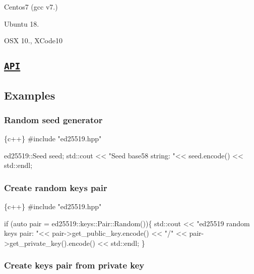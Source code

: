 \begin{DoxyEnumerate}
\item Centos7 (gcc v7.)
\end{DoxyEnumerate}
\begin{DoxyEnumerate}
\item Ubuntu 18.
\end{DoxyEnumerate}
\begin{DoxyEnumerate}
\item O\+SX 10., X\+Code10
\end{DoxyEnumerate}

\subsection*{\href{https://htmlpreview.github.io/?https://github.com/dnevera/ed25519cpp/blob/master/docs/html/namespaces.html}{\tt A\+PI}}

\subsection*{Examples}

\subsubsection*{Random seed generator}


\begin{DoxyCode}
\{c++\}
#include "ed25519.hpp"


ed25519::Seed seed;
std::cout << "Seed base58 string: "<< seed.encode() << std::endl;
\end{DoxyCode}


\subsubsection*{Create random keys pair}


\begin{DoxyCode}
\{c++\}
#include "ed25519.hpp"

if (auto pair = ed25519::keys::Pair::Random())\{
    std::cout << "ed25519 random keys pair: "<< pair->get\_public\_key.encode() << "/" << 
       pair->get\_private\_key().encode() << std::endl;
\}
\end{DoxyCode}


\subsubsection*{Create keys pair from private key}


